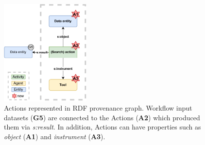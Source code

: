 \begin{figure}[ht]
    \centering
    \includegraphics[width=0.4\textwidth]{rdf_extension/CWLProv_graph_extended_actions.pdf}
    \caption{Actions represented in RDF provenance graph. Workflow input datasets (\textbf{G5}) are connected to the Actions (\textbf{A2}) which produced them via \emph{s:result}. In addition, Actions can have properties such as \emph{object} (\textbf{A1}) and \emph{instrument} (\textbf{A3}).  }
    \label{fig:cwlprov_graph_actions}
\end{figure}